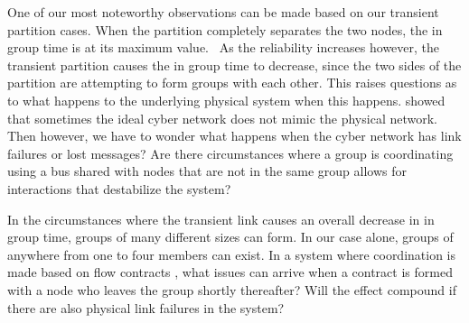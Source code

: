 One of our most noteworthy observations can be made based on our transient partition cases. When the partition completely separates the two nodes, the in group time is at its maximum value.  As the reliability increases however, the transient partition causes the in group time to decrease, since the two sides of the partition are attempting to form groups with each other. This raises questions as to what happens to the underlying physical system when this happens.
\cite{NETWORKTOPOLOGY} showed that sometimes the ideal cyber network does not mimic the physical network. Then however, we have to wonder what happens when the cyber network has link failures or lost messages? Are there circumstances where a group is coordinating using a bus shared with nodes that are not in the same group allows for interactions that destabilize the system?

In the circumstances where the transient link causes an overall decrease in in group time, groups of many different sizes can form. In our case alone, groups of anywhere from one to four members can exist. In a system where coordination is made based on flow contracts \cite{LOADBALANCING}, what issues can arrive when a contract is formed with a node who leaves the group shortly thereafter? Will the effect compound if there are also physical link failures in the system?
